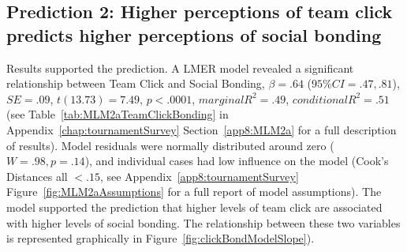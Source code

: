 \begin{CJK}{UTF8}{gbsn}









\subsection{Prediction 2: Higher perceptions of team click predicts higher perceptions of social bonding}

 Results supported the prediction.  A LMER model revealed a significant relationship between Team Click and Social Bonding, $\beta = .64$ ($95\% CI =  .47, .81$), $SE = .09$, $t(13.73) = 7.49$, $p < .0001$, $marginal R^2 = .49$, $conditional R^2 = .51$ (see Table~\ref{tab:MLM2aTeamClickBonding} in Appendix~\ref{chap:tournamentSurvey} Section~\ref{app8:MLM2a} for a full description of results).  Model residuals were normally distributed around zero ($W = .98, p = .14$), and individual cases had low influence on the model (Cook's Distances all $< .15$, see Appendix~\ref{app8:tournamentSurvey} Figure~\ref{fig:MLM2aAssumptions} for a full report of model assumptions).  The model supported the prediction that higher levels of team click are associated with higher levels of social bonding.  The relationship between these two variables is represented graphically in Figure~\ref{fig:clickBondModelSlope}).


\end{CJK}
